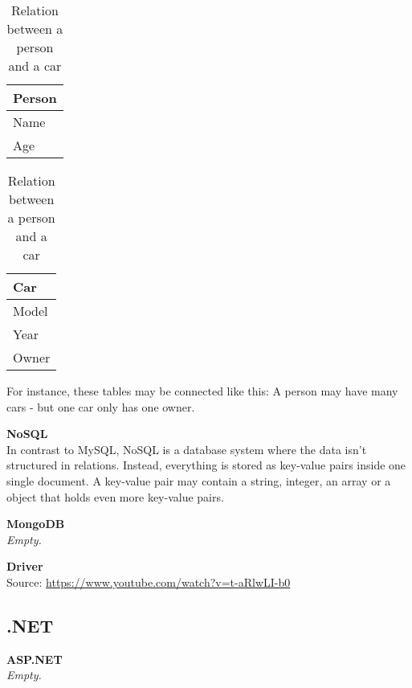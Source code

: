 \begin{table}[!htb]
    \caption{Relation between a person and a car}
    \begin{minipage}{.5\linewidth}
      \centering
        \begin{tabular}{|l|}
            \hline
            \textbf{Person} \\ \hline
            Name            \\ \hline
            Age             \\ \hline
        \end{tabular}
    \end{minipage}%
    \begin{minipage}{.5\linewidth}
      \centering
        \begin{tabular}{|l|}
            \hline
            \textbf{Car}    \\ \hline
            Model            \\ \hline
            Year             \\ \hline
            Owner             \\ \hline
        \end{tabular}
    \end{minipage} 
\end{table}

For instance, these tables may be connected like this: A person may have many cars - but one car only has one owner. 

\textbf{NoSQL } \cite{software:NoSQL} \\
In contrast to MySQL, NoSQL is a database system where the data isn't structured in relations. Instead, everything is stored as key-value pairs inside one single document. A key-value pair may contain a string, integer, an array or a object that holds even more key-value pairs. 

\textbf{MongoDB} \cite{software:MongoDB} \\
\textit{Empty.}


\textbf{Driver} \\
Source: \url{https://www.youtube.com/watch?v=t-aRlwLI-b0}

\clearpage
\subsection{.NET}

\textbf{ASP.NET} \\
\textit{Empty.}


